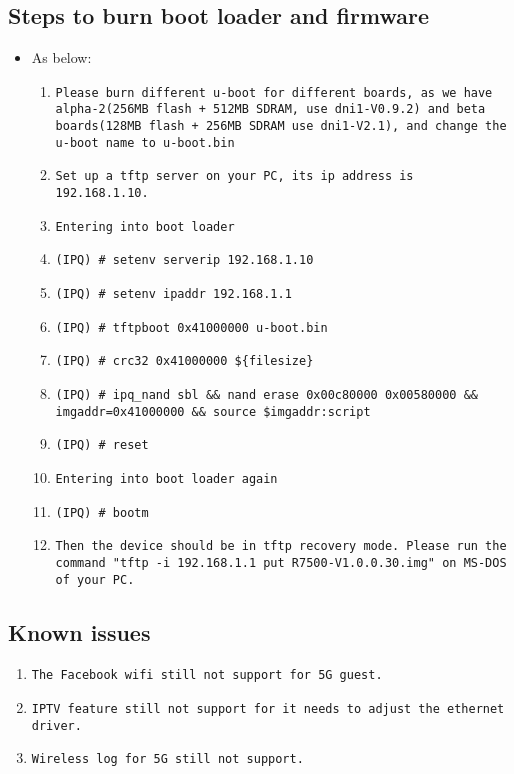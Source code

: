 \documentclass[12pt]{report}
\begin{document}
    \subsection{Steps to burn boot loader and firmware}
    \begin{itemize}
    \item As below:
            \begin{enumerate}
	    	\item \texttt{Please burn different u-boot for different boards, as we have alpha-2(256MB flash + 512MB SDRAM, use dni1-V0.9.2) and beta boards(128MB flash + 256MB SDRAM use dni1-V2.1), and change the u-boot name to u-boot.bin}
		\item \texttt{Set up a tftp server on your PC, its ip address is 192.168.1.10.}
		\item \texttt{Entering into boot loader}
		\item \texttt{(IPQ) \# setenv serverip 192.168.1.10}
		\item \texttt{(IPQ) \# setenv ipaddr 192.168.1.1}
		\item \texttt{(IPQ) \# tftpboot 0x41000000 u-boot.bin}
		\item \texttt{(IPQ) \# crc32 0x41000000 \$\{filesize\}}
		\item \texttt{(IPQ) \# ipq\_nand sbl \&\& nand erase 0x00c80000 0x00580000 \&\& imgaddr=0x41000000 \&\& source \$imgaddr:script}
		\item \texttt{(IPQ) \# reset}
		\item \texttt{Entering into boot loader again}
		\item \texttt{(IPQ) \# bootm}
		\item \texttt{Then the device should be in tftp recovery mode. Please run the command "tftp -i 192.168.1.1 put R7500-V1.0.0.30.img" on MS-DOS of your PC.}
            \end{enumerate}
    \end{itemize}

\subsection{Known issues}
            \begin{enumerate}
		\item \texttt{The Facebook wifi still not support for 5G guest.}
		\item \texttt{IPTV feature still not support for it needs to adjust the ethernet driver.}
		\item \texttt{Wireless log for 5G still not support.}
            \end{enumerate}
\end{document}
